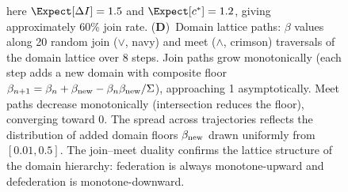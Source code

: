 \begin{figure}[!htbp]
{    here $\Expect[\Delta I] = 1.5$ and $\Expect[c^*] = 1.2$, giving approximately
    60\% join rate.
    (\textbf{D})~Domain lattice paths: $\beta$ values along 20 random join ($\vee$, navy)
    and meet ($\wedge$, crimson) traversals of the domain lattice over 8 steps.
    Join paths grow monotonically (each step adds a new domain with composite floor
    $\beta_{n+1} = \beta_n + \beta_{\rm new} - \beta_n\beta_{\rm new}/\Sigma$),
    approaching 1 asymptotically.
    Meet paths decrease monotonically (intersection reduces the floor),
    converging toward 0.
    The spread across trajectories reflects the distribution of added domain floors
    $\beta_{\rm new}$ drawn uniformly from $[0.01, 0.5]$.
    The join--meet duality confirms the lattice structure of the domain hierarchy:
    federation is always monotone-upward and defederation is monotone-downward.}
    \label{fig:intelligence_federation}
\end{figure}
